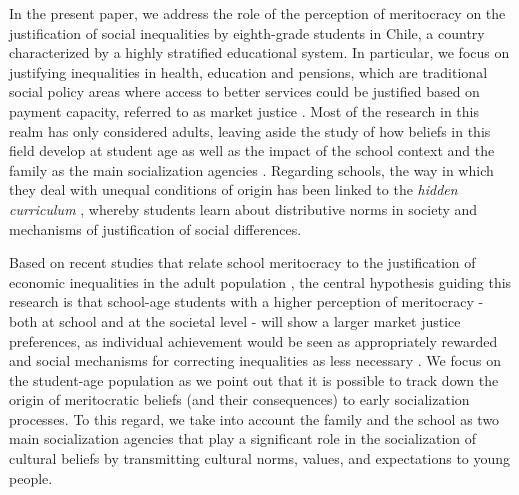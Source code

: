 \documentclass[
    behavsci,
    article,
    submit,
moreauthors
]{mdpi}
\begin{document}
In the present paper, we address the role of the perception of
meritocracy on the justification of social inequalities by eighth-grade
students in Chile, a country characterized by a highly stratified
educational system. In particular, we focus on justifying inequalities
in health, education and pensions, which are traditional social policy
areas where access to better services could be justified based on
payment capacity, referred to as market justice
\citep{lane_market_1986, lindh_bringing_2023}. Most of the research in
this realm has only considered adults, leaving aside the study of how
beliefs in this field develop at student age as well as the impact of
the school context and the family as the main socialization agencies
\citep{batruch_belief_2022}. Regarding schools, the way in which they
deal with unequal conditions of origin has been linked to the
\emph{hidden curriculum} \citep{chafel_schooling_1997}, whereby students
learn about distributive norms in society and mechanisms of
justification of social differences.

Based on recent studies that relate school meritocracy to the
justification of economic inequalities in the adult population
\citep{batruch_belief_2022, wiederkehr_belief_2015}, the central
hypothesis guiding this research is that school-age students with a
higher perception of meritocracy - both at school and at the societal
level - will show a larger market justice preferences, as individual
achievement would be seen as appropriately rewarded and social
mechanisms for correcting inequalities as less necessary
\citep{batruch_belief_2022}. We focus on the student-age population as
we point out that it is possible to track down the origin of
meritocratic beliefs (and their consequences) to early socialization
processes. To this regard, we take into account the family and the
school as two main socialization agencies that play a significant role
in the socialization of cultural beliefs by transmitting cultural norms,
values, and expectations to young people.
\end{document}
